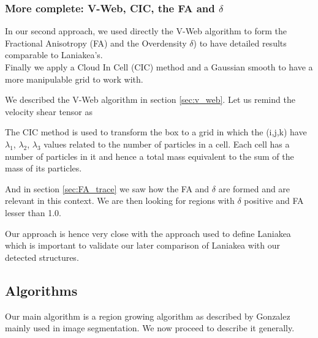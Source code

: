 \documentclass[12pt]{article}
\begin{document}
\subsubsection{More complete: V-Web, CIC, the FA and $\delta$}

\begin{par}
In our second approach, we used directly the V-Web
 algorithm to form the Fractional Anisotropy (FA)
  and the Overdensity $\delta$) to have detailed
   results comparable to Laniakea's.\\
Finally we apply a Cloud In Cell (CIC) method and
 a Gaussian smooth to have a more manipulable grid
  to work with.\\
\end{par}


\begin{par}
We described the V-Web algorithm in section
 \ref{sec:v_web}. Let us remind the velocity shear
  tensor as 
\end{par}

\begin{par}
The CIC method is used to transform the box to a
 grid in which the (i,j,k) have {$\lambda_1$,
  $\lambda_2$, $\lambda_3$} values related to the
   number of particles in a cell.
Each cell has a number of particles in it and
 hence a total mass equivalent to the sum of the
  mass of its particles.
\end{par}

\begin{par}
And in section \ref{sec:FA_trace} we saw how the
 FA and $\delta$ are formed and are relevant in
  this context. 
We are then looking for regions with $\delta$
 positive and FA lesser than 1.0.
\end{par}

\begin{par}
Our approach is hence very close with the approach
 used to define Laniakea
  \cite{tully_laniakea_2014} which is important to
   validate our later comparison of Laniakea with
    our detected structures.
\end{par}

\subsection{Algorithms}

Our main algorithm is a region growing algorithm
 as described by Gonzalez
  \cite{gonzalez_digital_2008} mainly used in
   image segmentation. We now proceed to describe
    it generally.
\end{document}
